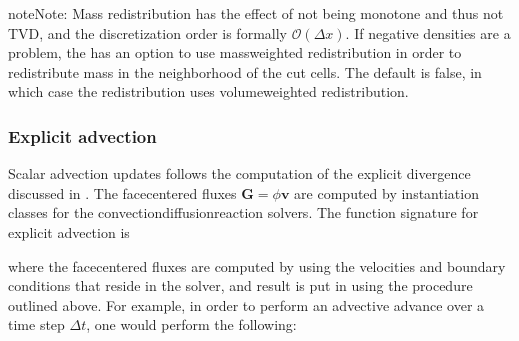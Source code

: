 \documentclass[letterpaper,10pt,english]{sphinxmanual}
\begin{document}
\begin{sphinxadmonition}{note}{Note:}
Mass redistribution has the effect of not being monotone and thus not TVD, and the discretization order is formally \(\mathcal{O}(\Delta x)\).
If negative densities are a problem, the  has an option to use mass\sphinxhyphen{}weighted redistribution in order to redistribute mass in the neighborhood of the cut cells.
The default is false, in which case the redistribution uses volume\sphinxhyphen{}weighted redistribution.
\end{sphinxadmonition}


\subsubsection{Explicit advection}
\label{\detokenize{Solvers/CDR:explicit-advection}}\label{\detokenize{Solvers/CDR:chap-explicitadvection}}
Scalar advection updates follows the computation of the explicit divergence discussed in {\hyperref[\detokenize{Solvers/CDR:chap-explicitdivergence}]{}}.
The face\sphinxhyphen{}centered fluxes \(\mathbf{G} = \phi\mathbf{v}\) are computed by instantiation classes for the convection\sphinxhyphen{}diffusion\sphinxhyphen{}reaction solvers.
The function signature for explicit advection is

\begin{sphinxVerbatim}[commandchars=\\\{\},formatcom=\scriptsize]
        
\end{sphinxVerbatim}

where the face\sphinxhyphen{}centered fluxes are computed by using the velocities and boundary conditions that reside in the solver, and result is put in  using the procedure outlined above.
For example, in order to perform an advective advance over a time step \(\Delta t\), one would perform the following:
\end{document}
